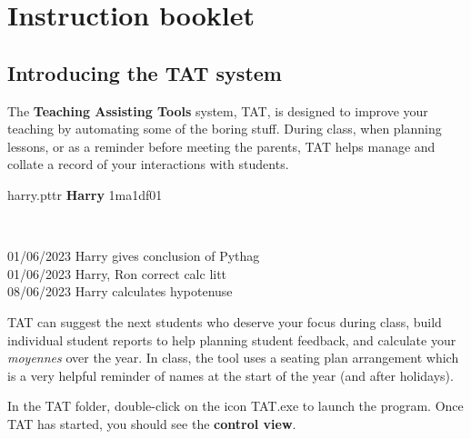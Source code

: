 \documentclass[10pt]{article}
\begin{document}
\newpage
\section{Instruction booklet} \label{instructions} 

\subsection{Introducing the TAT system}
The \textbf{Teaching Assisting Tools} system, TAT, is designed to improve your teaching by automating some of the boring stuff. During class, when planning lessons, or as a reminder before meeting the parents, TAT helps manage and collate a record of your interactions with students.

\begin{center}
\begin{tcolorbox}

harry.pttr \hfill \textbf{Harry} \hfill 1ma1df01

\

\small{
01/06/2023 Harry gives conclusion of Pythag \\
01/06/2023 Harry, Ron correct calc litt \\
08/06/2023 Harry calculates hypotenuse
}

\vspace{10mm}

\begin{center}
\end{center}

\end{tcolorbox}
\end{center}

TAT can suggest the next students who deserve your focus during class, build individual student reports to help planning student feedback, and calculate your \emph{moyennes} over the year. In class, the tool uses a seating plan arrangement which is a very helpful reminder of names at the start of the year (and after holidays).

In the TAT folder, double-click on the icon TAT.exe to launch the program. Once TAT has started, you should see the \textbf{control view}.
\end{document}
